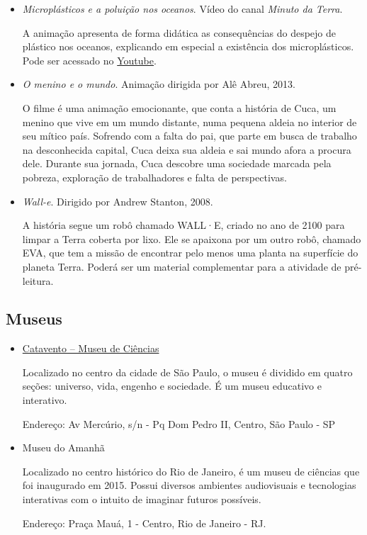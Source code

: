 \documentclass[11pt]{extarticle}
\begin{document}
\begin{itemize}

\item \textit{Microplásticos e a poluição nos oceanos}. Vídeo do canal \textit{Minuto da Terra}. 

A animação apresenta de forma didática as consequências do despejo de plástico nos oceanos, explicando em especial a existência dos microplásticos. Pode ser acessado no \href{https://youtu.be/adc0cOqE4qs}{Youtube}. 

\item \textit{O menino e o mundo}. Animação dirigida por Alê Abreu, 2013.

O filme é uma animação emocionante, que conta a história de Cuca, um menino que vive em um mundo distante, numa pequena aldeia no interior de seu mítico país. Sofrendo com a falta do pai, que parte em busca de trabalho na desconhecida capital, Cuca deixa sua aldeia e sai mundo afora a procura dele. Durante sua jornada, Cuca descobre uma sociedade marcada pela pobreza, exploração de trabalhadores e falta de perspectivas.

\item \textit{Wall-e}. Dirigido por Andrew Stanton, 2008.

A história segue um robô chamado WALL·E, criado no ano de 2100 para limpar a Terra coberta por lixo. Ele se apaixona por um outro robô, chamado EVA, que tem a missão de encontrar pelo menos uma planta na superfície do planeta Terra. Poderá ser um material complementar para a atividade de pré-leitura.

\end{itemize}

\subsection{Museus}

\begin{itemize}

\item \href{https://museucatavento.org.br/}{Catavento – Museu de Ciências}

Localizado no centro da cidade de São Paulo, o museu é dividido em quatro seções: universo, vida, engenho e sociedade. É um museu educativo e interativo.

Endereço: Av Mercúrio, s/n - Pq Dom Pedro II, Centro, São Paulo - SP

\item {Museu do Amanhã}

Localizado no centro histórico do Rio de Janeiro, é um museu de ciências que foi inaugurado em 2015. Possui diversos ambientes audiovisuais e tecnologias interativas com o intuito de imaginar futuros possíveis.

Endereço: Praça Mauá, 1 - Centro, Rio de Janeiro - RJ.

\end{itemize}
\end{document}
